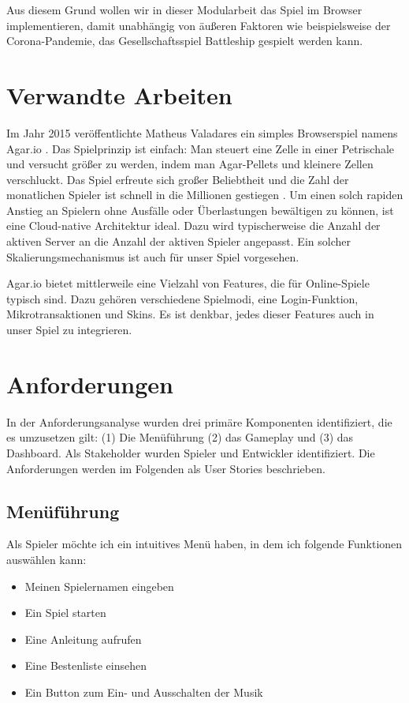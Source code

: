 \documentclass[a4paper, 10pt, conference]{IEEEtran}
\begin{document}
Aus diesem Grund wollen wir in dieser Modularbeit das Spiel im Browser implementieren, damit unabhängig von äußeren Faktoren wie beispielsweise der Corona-Pandemie, das Gesellschaftsspiel Battleship gespielt werden kann. 

\section{Verwandte Arbeiten}\label{sec:verwandte_arbeiten}

Im Jahr 2015 veröffentlichte Matheus Valadares ein simples Browserspiel namens Agar.io \cite{agario}. Das Spielprinzip ist einfach: Man steuert eine Zelle in einer Petrischale und versucht größer zu werden, indem man Agar-Pellets und kleinere Zellen verschluckt. Das Spiel erfreute sich großer Beliebtheit und die Zahl der monatlichen Spieler ist schnell in die Millionen gestiegen \cite{takahashi2017}. Um einen solch rapiden Anstieg an Spielern ohne Ausfälle oder Überlastungen bewältigen zu können, ist eine Cloud-native Architektur ideal. Dazu wird typischerweise die Anzahl der aktiven Server an die Anzahl der aktiven Spieler angepasst. Ein solcher Skalierungsmechanismus ist auch für unser Spiel vorgesehen.

Agar.io bietet mittlerweile eine Vielzahl von Features, die für Online-Spiele typisch sind. Dazu gehören verschiedene Spielmodi, eine Login-Funktion, Mikrotransaktionen und Skins. Es ist denkbar, jedes dieser Features auch in unser Spiel zu integrieren.

\section{Anforderungen}\label{sec:anforderungen}
In der Anforderungsanalyse wurden drei primäre Komponenten identifiziert, die es umzusetzen gilt: (1) Die Menüführung (2) das Gameplay und (3) das Dashboard. Als Stakeholder wurden Spieler und Entwickler identifiziert. Die Anforderungen werden im Folgenden als User Stories beschrieben.


\subsection{Menüführung}
Als Spieler möchte ich ein intuitives Menü haben, in dem ich folgende Funktionen auswählen kann:
\begin{itemize}
	\item Meinen Spielernamen eingeben
	\item Ein Spiel starten
	\item Eine Anleitung aufrufen
	\item Eine Bestenliste einsehen
	\item Ein Button zum Ein- und Ausschalten der Musik
\end{itemize}
\end{document}
